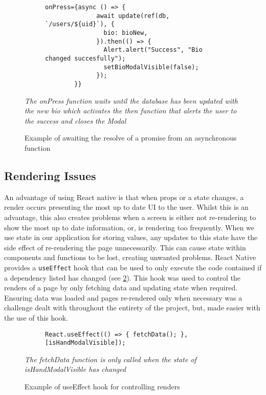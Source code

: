 \begin{figure}[!htbp]
    \centering
    \begin{subfigure}[b]{0.8\textwidth}
        \begin{lstlisting}[language=jsJsx]
        onPress={async () => {
              await update(ref(db, `/users/${uid}`), {
                bio: bioNew,
              }).then(() => {
                Alert.alert("Success", "Bio changed succesfully");
                setBioModalVisible(false);
              });
        }}
        \end{lstlisting}
    \end{subfigure}
\caption{Example of awaiting the resolve of a promise from an asynchronous function}
\small\textit{The onPress function waits until the database has been updated with the new bio which activates the then function that alerts the user to the success and closes the Modal}
\label{fig:asyncAwait}
\end{figure}
\FloatBarrier

\subsection*{Rendering Issues}
An advantage of using React native is that when props or a state changes, a render occurs presenting the most up to date UI to the user. Whilst this is an advantage, this also creates problems when a screen is either not re-rendering to show the most up to date information, or, is rendering too frequently. When we use state in our application for storing values, any updates to this state have the side effect of re-rendering the page unnecessarily. This can cause state within components and functions to be lost, creating unwanted problems. React Native provides a \texttt{useEffect} hook that can be used to only execute the code contained if a dependency listed has changed (see \ref{fig:useEffect}). This hook was used to control the renders of a page by only fetching data and updating state when required. Ensuring data was loaded and pages re-rendered only when necessary was a challenge dealt with throughout the entirety of the project, but, made easier with the use of this hook.
\begin{figure}[!htbp]
    \centering
    \begin{subfigure}[b]{0.8\textwidth}
        \begin{lstlisting}[language=jsJsx]
        React.useEffect(() => { fetchData(); }, [isHandModalVisible]);
        \end{lstlisting}
    \end{subfigure}
\caption{Example of useEffect hook for controlling renders}
\small\textit{The fetchData function is only called when the state of isHandModalVisible has changed}
\label{fig:useEffect}
\end{figure}
\FloatBarrier

